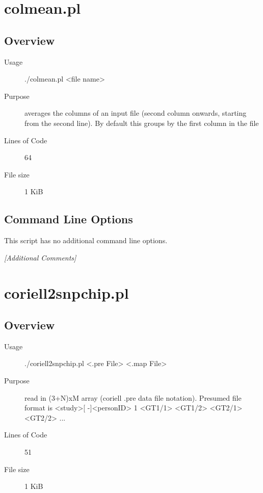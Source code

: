 \section{colmean.pl}
\label{sec:colmean.pl}

\subsection{Overview}
\label{sec:colmean.pl-overview}

\begin{description}
\item[Usage] ./colmean.pl <file name>
\item[Purpose] averages the columns of an input file (second column onwards, starting from the second line). By default this groups by the first column in the file
\item[Lines of Code] 64
\item[File size] 1 KiB
\end{description}

\subsection{Command Line Options}
\label{sec:colmean.pl-command-line}

This script has no additional command line options.

\emph{[Additional Comments]}

\section{coriell2snpchip.pl}
\label{sec:coriell2snpchip.pl}

\subsection{Overview}
\label{sec:coriell2snpchip.pl-overview}

\begin{description}
\item[Usage] ./coriell2snpchip.pl <.pre File> <.map File>
\item[Purpose] read in (3+N)xM array (coriell .pre data file notation). Presumed file format is <study>[ -]<personID> 1 <GT1/1> <GT1/2> <GT2/1> <GT2/2> ...
\item[Lines of Code] 51
\item[File size] 1 KiB
\end{description}

